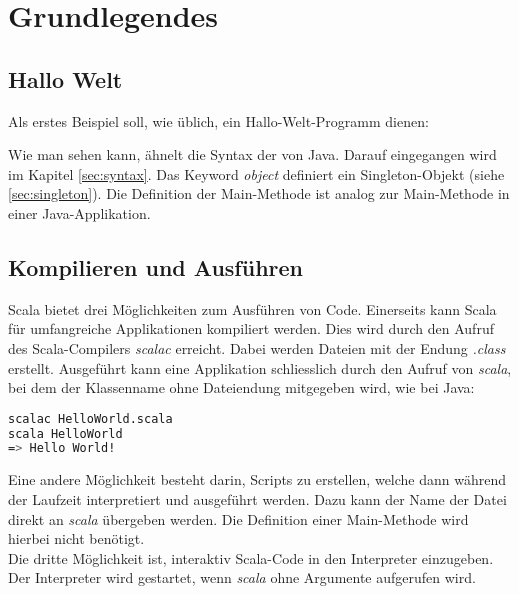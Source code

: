 \chapter{Grundlegendes}

\section{Hallo Welt}
\label{sec:helloWorld}

Als erstes Beispiel soll, wie üblich, ein Hallo-Welt-Programm dienen:



Wie man sehen kann, ähnelt die Syntax der von Java. Darauf eingegangen
wird im Kapitel \ref{sec:syntax}. Das Keyword \emph{object} definiert
ein Singleton-Objekt (siehe \ref{sec:singleton}).
Die Definition der Main-Methode ist analog zur Main-Methode in
einer Java-Applikation.

\section{Kompilieren und Ausführen}

Scala bietet drei Möglichkeiten zum Ausführen von Code. Einerseits kann Scala
für umfangreiche Applikationen kompiliert werden. Dies wird durch den
Aufruf des Scala-Compilers \emph{scalac} erreicht. Dabei werden Dateien
mit der Endung \emph{.class} erstellt. Ausgeführt kann eine Applikation
schliesslich durch den Aufruf von \emph{scala}, bei dem der Klassenname 
ohne Dateiendung mitgegeben wird, wie bei Java:

\begin{lstlisting}[float=ht,language=bash,caption=Kompilieren und Ausführen von Scala-Code,label=lst:execute]
scalac HelloWorld.scala
scala HelloWorld
=> Hello World!
\end{lstlisting}

Eine andere Möglichkeit besteht darin, Scripts zu erstellen, welche dann
während der Laufzeit interpretiert und ausgeführt werden. Dazu kann
der Name der Datei direkt an \emph{scala} übergeben werden. Die Definition
einer Main-Methode wird hierbei nicht benötigt.\\

Die dritte Möglichkeit ist, interaktiv Scala-Code in den Interpreter 
einzugeben. Der Interpreter wird gestartet, wenn \emph{scala} ohne
Argumente aufgerufen wird.

